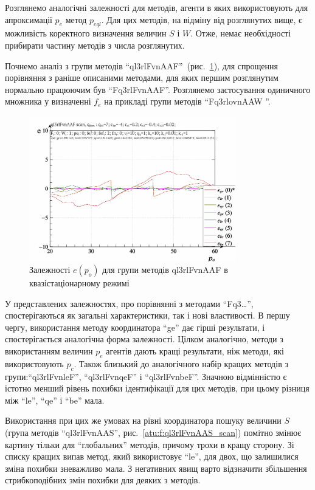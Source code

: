 Розглянемо аналогічні залежності для методів, агенти в яких
використовують для апроксимації
$ p_e $ метод
$ p_{eql} $. Для цих методів, на відміну від розглянутих вище, є
можливість коректного визначення величин
$S$ і
$W$. Отже, немає необхідності прибирати частину методів з числа
розглянутих.

Почнемо аналіз з групи методів ``ql3rlFvnAAF''~(рис.~\ref{atu:f:ql3rlFvnAAF_scan}),
для спрощення порівняння з раніше описаними методами, для яких
першим розглянутим нормально працюючим був ``Fq3rlFvnAAF''. Розглянемо
застосування одиничного множника у визначенні
$ f_e $ на прикладі групи методів ``Fq3rlovnAAW ''.

\begin{figure}[htb!]
  \begin{center}
    \includegraphics[width=0.8\textwidth]{p/scan/qls-p_p_e_ql3rlFvnAAF_scan.png}
  \end{center}
  \caption{Залежності $e(p_o)$ для групи методів ql3rlFvnAAF в квазістаціонарному режимі}
  \label{atu:f:ql3rlFvnAAF_scan}
\end{figure}

У представлених залежностях, про порівнянні з методами ``Fq3\ldots'',
спостерігаються як загальні характеристики, так і нові
властивості. В першу чергу, використання методу координатора
``ge'' дає гірші результати, і спостерігається аналогічна форма
залежності. Цілком аналогічно, методи з використанням величин
$ p_e $ агентів дають кращі результати, ніж методи, які
використовують
$ p_c $. Також близький до аналогічного набір кращих методів з
групи:``ql3rlFvnleF'', ``ql3rlFvnqeF'' і ``ql3rlFvnbeF''. Значною відмінністю є
істотно менший рівень похибки ідентифікації для цих методів,
при цьому різниця між ``le'', ``qe'' і ``be'' мала.


Використання при цих же умовах на рівні координатора пошуку
величини
$S$ (група методів ``ql3rlFvnAAS'', рис.~\ref{atu:f:ql3rlFvnAAS_scan}) помітно змінює
картину тільки для ``глобальних'' методів, причому трохи  в
кращу сторону. Зі списку кращих випав метод, який використовує
``le'', для двох, що залишилися зміна похибки зневажливо мала. З
негативних явищ варто відзначити збільшення стрибкоподібних
змін похибки для деяких з методів.

